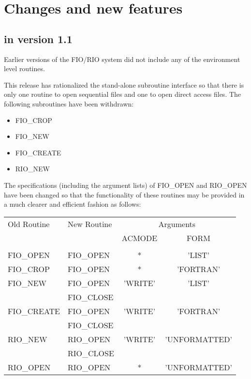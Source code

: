 \section{Changes and new features}

\subsection{in version 1.1}

Earlier versions of the FIO/RIO system did not include any of the
environment level routines.

This release has rationalized the stand-alone subroutine interface so that 
there is only one routine to open sequential files and one to open direct 
access files.
The following subroutines have been withdrawn:

\begin{itemize}
\item FIO\_CROP
\item FIO\_NEW
\item FIO\_CREATE
\item RIO\_NEW
\end{itemize}

The specifications (including the argument lists) of FIO\_OPEN and RIO\_OPEN 
have been changed so that the functionality of these routines may be provided 
in a much clearer and efficient fashion as follows:

\begin{tabular}{llcc}

Old Routine &   New Routine   &  \multicolumn{2}{c}{Arguments} \\
 & & ACMODE &  FORM \\
\hline \\
FIO\_OPEN   &    FIO\_OPEN  &      *     &    'LIST' \\
FIO\_CROP   &    FIO\_OPEN  &      *     &   'FORTRAN' \\
FIO\_NEW    &    FIO\_OPEN  &   'WRITE'  &    'LIST' \\
           &    FIO\_CLOSE & & \\
FIO\_CREATE &    FIO\_OPEN  &   'WRITE'  &   'FORTRAN' \\
           &    FIO\_CLOSE & & \\
RIO\_NEW    &    RIO\_OPEN  &   'WRITE'  &  'UNFORMATTED' \\
           &    RIO\_CLOSE & & \\
RIO\_OPEN   &    RIO\_OPEN  &      *     &  'UNFORMATTED'

\end{tabular}

